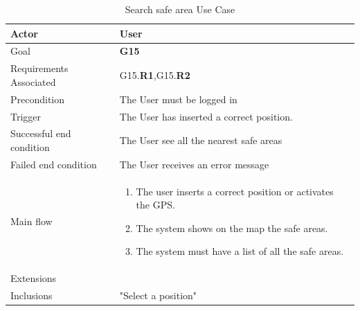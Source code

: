 \newline
\begin{table}[htb]
\begin{center}
\renewcommand{\arraystretch}{1.5}
\begin{tabular}{|l|p{}|}
\hline
Actor & User \\ \hline
Goal & \textbf{G15} \\ \hline
Requirements Associated & G15.\textbf{R1},G15.\textbf{R2} \\ \hline
Precondition & The User must be logged in \\ \hline
Trigger & The User has inserted a correct position. \\ \hline
Successful end condition & The User see all the nearest safe areas \\ \hline
Failed end condition & The User receives an error message \\ \hline
Main flow & \begin{minipage}[t]{0.6\textwidth}
\begin{enumerate}
\addtolength{\itemindent}{0.5cm}
\item The user inserts a correct position or activates the GPS.
\item The system shows on the map the safe areas.
\item The system must have a list of all the safe areas.
\end{enumerate}
\end{minipage} \\ \hline
Extensions & \\ \hline
Inclusions & "Select a position" \\ \hline
\end{tabular}
\caption{Search safe area Use Case}
\end{center}
\end{table}
\clearpage

